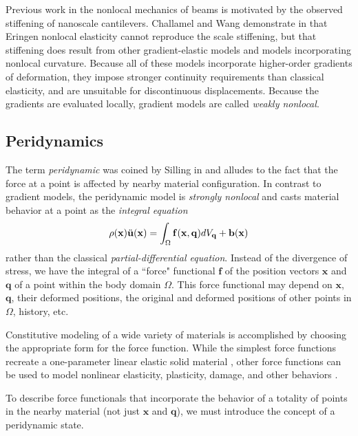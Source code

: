 \documentclass[preprint,review,12pt]{elsarticle}
\newcommand{\mathbi}[1]{\mathit{\mathbf{#1}}}
\begin{document}
Previous work in the nonlocal mechanics of beams is motivated by the observed stiffening of nanoscale cantilevers.
Challamel and Wang demonstrate in \cite{Challamel2008small} that Eringen nonlocal elasticity cannot reproduce the scale stiffening, but that stiffening does result from other gradient-elastic models and models incorporating nonlocal curvature.
Because all of these models incorporate higher-order gradients of deformation, they impose stronger continuity requirements than classical elasticity, and are unsuitable for discontinuous displacements.
Because the gradients are evaluated locally, gradient models are called \textit{weakly nonlocal}.

%
\subsection{Peridynamics}
\label{sec:PDintro}
The term \textit{peridynamic} was coined by Silling in \cite{silling2000reformulation} and alludes to the fact that the force at a point is affected by nearby material configuration.
In contrast to gradient models, the peridynamic model is \textit{strongly nonlocal} and casts material behavior at a point as the \textit{integral equation} 
%
\begin{equation}
\label{eq:PDCoPV}
\rho(\mathbf{x})\ddot{\mathbf{u}}(\mathbf{x}) = \int_\Omega \mathbi{f}(\mathbf{x},\mathbf{q}) dV_\mathbf{q}  + \mathbf{b}(\mathbf{x}) \notag
\end{equation}
%
rather than the classical \textit{partial-differential equation}.
Instead of the divergence of stress, we have the integral of a ``force" functional $\mathbi{f}$ of the position vectors $\mathbf{x}$ and  $\mathbf{q}$ of a point within the body domain $\Omega$. 
This force functional may depend on $\mathbf{x}$, $\mathbf{q}$, their deformed positions, the original and deformed positions of other points in $\Omega$, history, etc.

Constitutive modeling of a wide variety of materials is accomplished by choosing the appropriate form for the force function.  While the simplest force functions recreate a one-parameter linear elastic solid material \cite{silling2000reformulation}, other force functions can be used to model nonlinear elasticity, plasticity, damage, and other behaviors \cite{silling2005peridynamic}.

To describe force functionals that incorporate the behavior of a totality of points in the nearby material (not just $\mathbf{x}$ and $\mathbf{q}$), we must introduce the concept of a peridynamic state.
\end{document}
